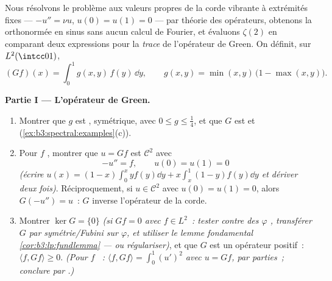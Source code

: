 \begin{problem}\label{pb:b3:spectral:1}
Nous résolvons le problème aux valeurs propres de la corde
vibrante à extrémités fixes --- $-u'' = \nu u$, $u(0) = u(1)
= 0$ --- par théorie des opérateurs, obtenons la 
orthonormée en sinus sans aucun calcul de Fourier, et
évaluons $\zeta(2)$ en comparant deux expressions pour la
\emph{trace} de l'opérateur de Green. On définit, sur
$L^2(\intcc01)$,
\[
(Gf)(x) = \int_0^1 g(x,y)\,f(y)\,\dd y,
\qquad
g(x, y) = \min(x,y)\,\bigl(1 - \max(x,y)\bigr).
\]

\medskip
\noindent\textbf{Partie I --- L'opérateur de Green.}
\begin{enumerate}
  \item Montrer que $g$ est , symétrique, avec $0
        \leq g \leq \frac14$, et que $G$ est  et
         (\cref{ex:b3:spectral:examples}(c)).
  \item Pour $f$ , montrer que $u = Gf$ est $\mathcal
        C^2$ avec
        \[
        -u'' = f, \qquad u(0) = u(1) = 0
        \]
        \emph{(écrire $u(x) = (1-x)\int_0^xyf(y)\dd y +
        x\int_x^1(1-y)f(y)\dd y$ et dériver deux fois)}.
        Réciproquement, si $u \in \mathcal C^2$ avec $u(0) =
        u(1) = 0$, alors $G(-u'') = u$~: $G$ inverse
        l'opérateur de la corde.
  \item Montrer $\ker G = \{0\}$ \emph{(si $Gf = 0$ avec $f
        \in L^2$~: tester contre des $\varphi$ ,
        transférer $G$ par symétrie/Fubini sur $\varphi$, et
        utiliser le lemme fondamental
        \cref{cor:b3:lp:fundlemma} --- ou régulariser)}, et
        que $G$ est un opérateur positif~: $\langle f,
        Gf\rangle \geq 0$. \emph{(Pour $f$ ~:
        $\langle f, Gf\rangle = \int_0^1 (u')^2$ avec $u =
        Gf$, par parties~; conclure par .)}
\end{enumerate}


\end{problem}
